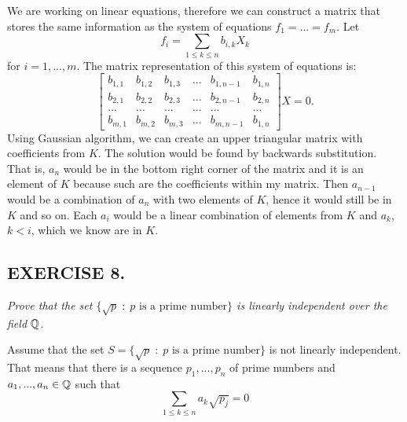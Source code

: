 \documentclass{article}
\begin{document}

We are working on linear equations, therefore we can construct a matrix that stores the same information as the system of equations $f_1=...=f_m$. Let
$$f_i=\sum\limits_{1\leq k\leq n}b_{i, k}X_k$$
for $i=1,...,m$. The matrix representation of this system of equations is:
$$\begin{bmatrix}
    b_{1,1} & b_{1, 2} & b_{1, 3} &... &b_{1, n-1} & b_{1, n}\\
    b_{2,1} & b_{2, 2} & b_{2, 3} &... &b_{2, n-1} & b_{2, n}\\
    ...     &   ...    & ...      &... & ...       & ...\\
    b_{m,1} & b_{m, 2} & b_{m, 3} &... &b_{m, n-1} & b_{1, n}
\end{bmatrix}X=0.$$
Using Gaussian algorithm, we can create an upper triangular matrix with coefficients from $K$. The solution would be found by backwards substitution. That is, $a_n$ would be in the bottom right corner of the matrix and it is an element of $K$ because such are the coefficients within my matrix. Then $a_{n-1}$ would be a combination of $a_n$ with two elements of $K$, hence it would still be in $K$ and so on. Each $a_i$ would be a linear combination of elements from $K$ and $a_k$, $k<i$, which we know are in $K$.

\proofend

\subsection*{EXERCISE 8.}
\emph{Prove that the set $\{\sqrt{p}\;:\;p\text{ is a prime number}\}$ is linearly independent over the field $\mathbb{Q}$.}
\smallskip


Assume that the set $S=\{\sqrt{p}\;:\;p\text{ is a prime number}\}$ is not linearly independent. That means that there is a sequence $p_1,...,p_n$ of prime numbers and $a_1,...,a_n\in\mathbb{Q}$ such that
$$\sum\limits_{1\leq k\leq n}a_k\sqrt{p_j}=0$$
\end{document}
